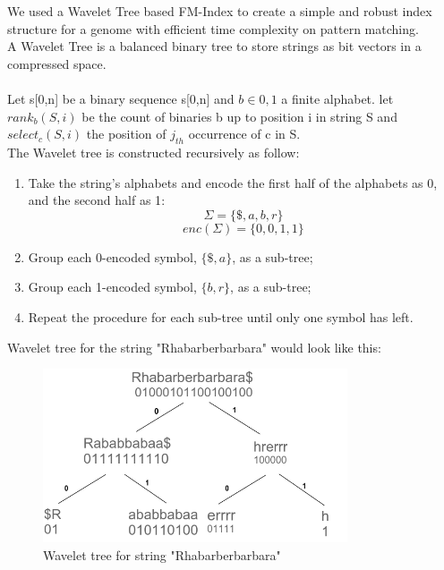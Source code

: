 \documentclass[11pt,a4paper]{report}
\begin{document}
We used a Wavelet Tree based FM-Index to create a simple and robust index structure for 
a genome with efficient time complexity on pattern matching.\\


A Wavelet Tree is a balanced binary tree to store strings as bit vectors in a 
compressed space\cite{navarroWavelet}\cite{Wavthesis}\cite{AlexBowe}.\\\\
Let s[0,n] be a binary sequence s[0,n] and $b \in {0,1}$ a finite alphabet. 
let $ rank_{b}(S, i)$ be the count of binaries b up to position i in string S 
and $ select_{c}(S,i)$  the position of $j_{th}$ occurrence of c in S.\\
The Wavelet tree is constructed recursively as follow:
\begin{enumerate}
    \item
		Take the string's alphabets and encode the first half of the alphabets as 0, and the second half as 1\cite {AlexBowe}:
    		$$\Sigma = \{ \$, a, b, r \}$$
			$$enc(\Sigma) = \{ 0, 0, 1, 1 \}$$
    \item
		Group each 0-encoded symbol, $\{ \$, a \}$, as a sub-tree;
    \item
		Group each 1-encoded symbol, $\{ b , r\}$, as a sub-tree;
    \item
		Repeat the procedure for each sub-tree until only one symbol has left.
\end{enumerate}
Wavelet tree for the string "Rhabarberbarbara" would look like this:
\begin{figure}[H]
\centering
\includegraphics[width=9cm]{pictures/wavelet.png}
\caption{Wavelet tree for string "Rhabarberbarbara"}
\label{fig:barbWavlet}
\end{figure}
\end{document}
